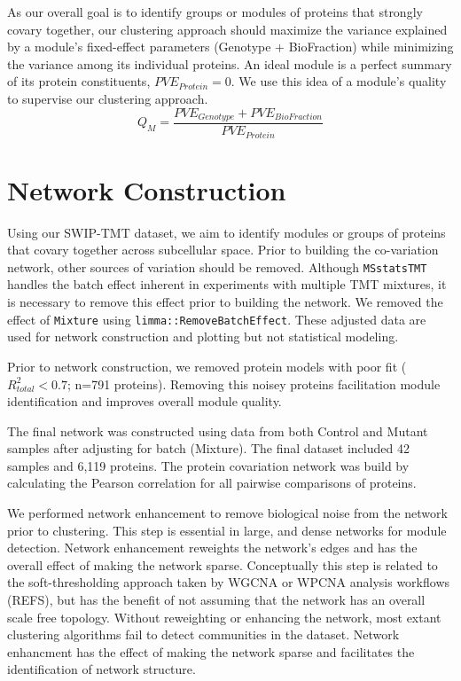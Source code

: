 \documentclass[11pt]{elife}\usepackage[]{graphicx}\usepackage[]{color}
\begin{document}
As our overall goal is to identify groups or modules of proteins that strongly
covary together, our clustering approach should maximize the variance explained
by a module's fixed-effect parameters (Genotype + BioFraction) while minimizing 
the variance among its individual proteins. 
An ideal module is a perfect summary of its protein constituents, 
$PVE_{Protein}=0$. We use this idea of a module's quality to supervise our 
clustering approach.
\begin{equation}
	Q_{M}=\frac{PVE_{Genotype} + PVE_{BioFraction}}{PVE_{Protein}}
\end{equation}


\section{Network Construction}

Using our SWIP-TMT dataset, we aim to identify modules or groups of
proteins that covary together across subcellular space. Prior to building the
co-variation network, other sources of variation should be removed. Although
\texttt{MSstatsTMT} handles the batch effect inherent in experiments with
multiple TMT mixtures, it is necessary to remove this effect prior to building
the network. We removed the effect of \texttt{Mixture} using
\texttt{limma::RemoveBatchEffect}. These adjusted data are used for network
construction and plotting but not statistical modeling.

Prior to network construction, we removed protein models with poor fit 
($R^2_{total}<0.7$; n=791 proteins). Removing this noisey proteins facilitation
module identification and improves overall module quality.

The final network was constructed using data from both Control and Mutant 
samples after adjusting for batch (Mixture). The final dataset included 
42 samples and 6,119 proteins. The protein covariation network was build by
calculating the Pearson correlation for all pairwise comparisons of proteins.

We performed network enhancement to remove biological noise from the network
prior to clustering. This step is essential in large, and dense networks for
module detection. Network enhancement reweights the
network's edges and has the overall effect of making the network sparse.
Conceptually this step is related to the soft-thresholding approach taken by
WGCNA or WPCNA analysis workflows (REFS), but has the benefit of not assuming
that the network has an overall scale free topology.  Without reweighting or
enhancing the network, most extant clustering algorithms fail to detect
communities in the dataset.  Network enhancment has the effect of making the
network sparse and facilitates the identification of network structure.\\
\end{document}
